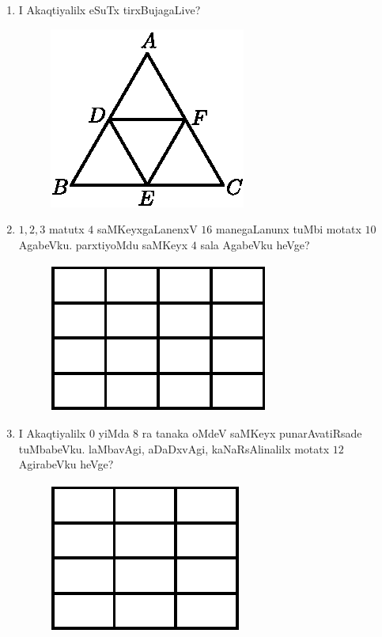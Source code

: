 \begin{enumerate}
\item I Akaqtiyalilx eSuTx tirxBujagaLive?
\begin{figure}[H]
\centering
\includegraphics{src/figures/exr16.eps}
\end{figure}


\item $1,2,3$ matutx $4$ saMKeyxgaLanenxV $16$ manegaLanunx tuMbi motatx $10$ AgabeVku. parxtiyoMdu saMKeyx $4$ sala AgabeVku heVge?
\begin{figure}[H]
\centering
\includegraphics{src/figures/exr17.eps}
\end{figure}

\eject

\item I Akaqtiyalilx $0$ yiMda $8$ ra tanaka oMdeV saMKeyx punarAvatiRsade tuMbabeVku. laMbavAgi, aDaDxvAgi, kaNaRsAlinalilx motatx $12$ AgirabeVku heVge?
\begin{figure}[H]
\centering
\includegraphics{src/figures/exr18.eps}
\end{figure}


\end{enumerate}
